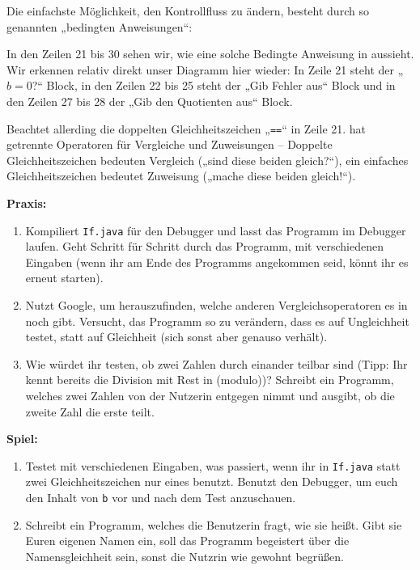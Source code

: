 Die einfachste Möglichkeit, den Kontrollfluss zu ändern, besteht durch so
genannten „bedingten Anweisungen“:


In den Zeilen 21 bis 30 sehen wir, wie eine solche Bedingte Anweisung in \Java
aussieht. Wir erkennen relativ direkt unser Diagramm hier wieder: In Zeile 21
steht der „$b=0$?“ Block, in den Zeilen 22 bis 25 steht der „Gib Fehler aus“
Block und in den Zeilen 27 bis 28 der „Gib den Quotienten aus“ Block.

Beachtet allerding die doppelten Gleichheitszeichen „\verb|==|“ in Zeile
21. \Java hat getrennte Operatoren für Vergleiche und Zuweisungen -- Doppelte
Gleichheitszeichen bedeuten Vergleich („sind diese beiden gleich?“), ein
einfaches Gleichheitszeichen bedeutet Zuweisung („mache diese beiden gleich!“).

\textbf{Praxis:}
\begin{enumerate}
\item Kompiliert \texttt{If.java} für den Debugger und lasst das Programm im
  Debugger laufen. Geht Schritt für Schritt durch das Programm, mit
  verschiedenen Eingaben (wenn ihr am Ende des Programms angekommen seid, könnt
  ihr es erneut starten).
\item Nutzt Google, um herauszufinden, welche anderen Vergleichsoperatoren
  es in \Java noch gibt. Versucht, das Programm so zu verändern, dass es
  auf Ungleichheit testet, statt auf Gleichheit (sich sonst aber genauso
  verhält).
\item Wie würdet ihr testen, ob zwei Zahlen durch einander teilbar sind (Tipp:
  Ihr kennt bereits die Division mit Rest in \Java (modulo))? Schreibt ein
  Programm, welches zwei Zahlen von der Nutzerin entgegen nimmt und ausgibt, ob
  die zweite Zahl die erste teilt.
\end{enumerate}

\textbf{Spiel:}
\begin{enumerate}
\item Testet mit verschiedenen Eingaben, was passiert, wenn ihr in
  \texttt{If.java} statt zwei Gleichheitszeichen nur eines benutzt. Benutzt den
  Debugger, um euch den Inhalt von \texttt{b} vor und nach dem Test anzuschauen.
\item Schreibt ein Programm, welches die Benutzerin fragt, wie sie heißt. Gibt
  sie Euren eigenen Namen ein, soll das Programm begeistert über die
  Namensgleichheit sein, sonst die Nutzrin wie gewohnt begrüßen.
\end{enumerate}
